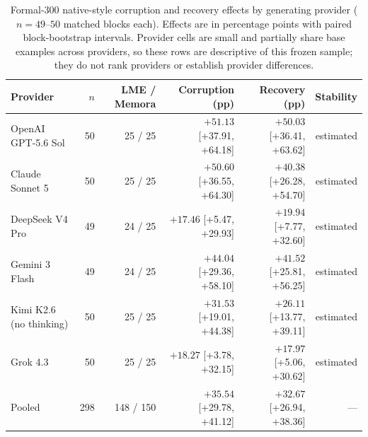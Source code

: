 \begin{table}[t]
\centering
\small
\caption{Formal-300 native-style corruption and recovery effects by
generating provider ($n = 49$--$50$ matched blocks each). Effects are in
percentage points with paired block-bootstrap intervals. Provider cells are
small and partially share base examples across providers, so these rows are
descriptive of this frozen sample; they do not rank providers or establish
provider differences.}
\label{tab:formal300-provider}
\begin{tabular}{lrrrrr}
\toprule
Provider & $n$ & LME / Memora & Corruption (pp) & Recovery (pp) & Stability \\
\midrule
OpenAI GPT-5.6 Sol & 50 & 25 / 25 & $+51.13$ [+37.91, +64.18] & $+50.03$ [+36.41, +63.62] & estimated \\
Claude Sonnet 5 & 50 & 25 / 25 & $+50.60$ [+36.55, +64.30] & $+40.38$ [+26.28, +54.70] & estimated \\
DeepSeek V4 Pro & 49 & 24 / 25 & $+17.46$ [+5.47, +29.93] & $+19.94$ [+7.77, +32.60] & estimated \\
Gemini 3 Flash & 49 & 24 / 25 & $+44.04$ [+29.36, +58.10] & $+41.52$ [+25.81, +56.25] & estimated \\
Kimi K2.6 (no thinking) & 50 & 25 / 25 & $+31.53$ [+19.01, +44.38] & $+26.11$ [+13.77, +39.11] & estimated \\
Grok 4.3 & 50 & 25 / 25 & $+18.27$ [+3.78, +32.15] & $+17.97$ [+5.06, +30.62] & estimated \\
\midrule
Pooled & 298 & 148 / 150 & $+35.54$ [+29.78, +41.12] & $+32.67$ [+26.94, +38.36] & --- \\
\bottomrule
\end{tabular}
\end{table}

